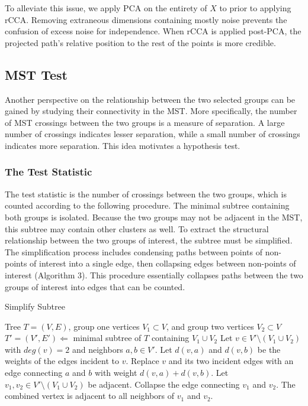 \documentclass{article}
\begin{document}
To alleviate this issue, we apply PCA on the entirety of $X$ to prior to applying rCCA. Removing extraneous dimensions containing mostly noise prevents the confusion of excess noise for independence. When rCCA is applied post-PCA, the projected path's relative position to the rest of the points is more credible.

\subsection{MST Test}
Another perspective on the relationship between the two selected groups can be gained by studying their connectivity in the MST. More specifically, the number of MST crossings between the two groups is a measure of separation. A large number of crossings indicates lesser separation, while a small number of crossings indicates more separation. This idea motivates a hypothesis test.

\subsubsection{The Test Statistic}
The test statistic is the number of crossings between the two groups, which is counted according to the following procedure. The minimal subtree containing both groups is isolated. Because the two groups may not be adjacent in the MST, this subtree may contain other clusters as well. To extract the structural relationship between the two groups of interest, the subtree must be simplified. The simplification process includes condensing paths between points of non-points of interest into a single edge, then collapsing edges between non-points of interest (Algorithm 3).  This procedure essentially collapses paths between the two groups of interest into edges that can be counted.

\begin{algorithm}[H]
\caption{Simplify Subtree}\label{algo3}
\begin{algorithmic}[3]
\Require Tree $T = (V,E)$, group one vertices $V_1 \subset V$, and group two vertices $V_2 \subset V$
\State $T' = (V', E') \Leftarrow$ minimal subtree of $T$ containing $V_1 \cup V_2$
\Repeat
	\State Let $v \in V' \setminus (V_1 \cup V_2)$ with $deg(v) = 2$ and neighbors $a, b \in V'$. Let $d(v, a)$ and $d(v, b)$ be the weights of the edges incident to $v$.
	\State Replace $v$ and its two incident edges with an edge connecting $a$ and $b$ with weight $d(v, a) + d(v, b)$.
\Repeat
	\State Let $v_1, v_2 \in V' \setminus (V_1 \cup V_2)$ be adjacent.
	\State Collapse the edge connecting $v_1$ and $v_2$. The combined vertex is adjacent to all neighbors of $v_1$ and $v_2$.
\end{algorithmic}
\end{algorithm}
\end{document}
